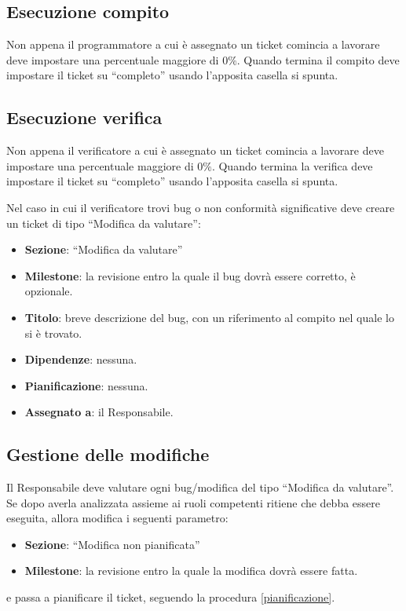 \subsection{Esecuzione compito}

Non appena il programmatore a cui è assegnato un ticket comincia a lavorare deve impostare una percentuale maggiore di $0\%$. Quando termina il compito deve impostare il ticket su ``completo'' usando l'apposita casella si spunta.

\subsection{Esecuzione verifica}

Non appena il verificatore a cui è assegnato un ticket comincia a lavorare deve impostare una percentuale maggiore di $0\%$. Quando termina la verifica deve impostare il ticket su ``completo'' usando l'apposita casella si spunta.

Nel caso in cui il verificatore trovi bug o non conformità significative deve creare un ticket di tipo ``Modifica da valutare'':
\begin{itemize}
 \item \textbf{Sezione}: ``Modifica da valutare''
 \item \textbf{Milestone}: la revisione entro la quale il bug dovrà essere corretto, è opzionale.
 \item \textbf{Titolo}: breve descrizione del bug, con un riferimento al compito nel quale lo si è trovato.
 \item \textbf{Dipendenze}: nessuna.
 \item \textbf{Pianificazione}: nessuna.
 \item \textbf{Assegnato a}: il Responsabile.
\end{itemize}

\subsection{Gestione delle modifiche}

Il Responsabile deve valutare ogni bug/modifica del tipo ``Modifica da valutare''. Se dopo averla analizzata assieme ai ruoli competenti ritiene che debba essere eseguita, allora modifica i seguenti parametro:
\begin{itemize}
 \item \textbf{Sezione}: ``Modifica non pianificata''
 \item \textbf{Milestone}: la revisione entro la quale la modifica dovrà essere fatta.
\end{itemize}
e passa a pianificare il ticket, seguendo la procedura \ref{pianificazione}.


